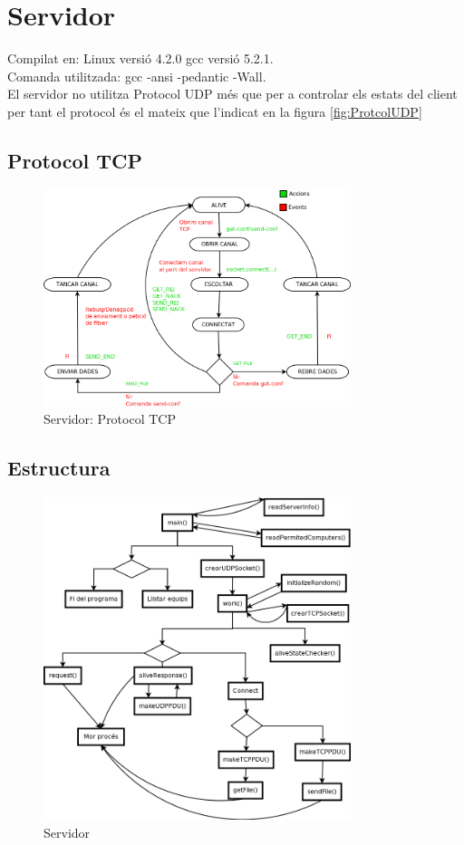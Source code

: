 \documentclass[11pt]{article}
\begin{document}
\section{Servidor}
Compilat en: Linux versió 4.2.0 gcc versió 5.2.1.\\
Comanda utilitzada: gcc -ansi -pedantic -Wall.\\
El servidor no utilitza Protocol UDP més que per a controlar els estats del client per tant el protocol és el mateix que l'indicat en la figura \ref{fig:ProtcolUDP}
\subsection{Protocol TCP}
\begin{figure}[h]
    \centering
    \includegraphics[width=0.8\textwidth]{ServidorTCP.png}
    \caption{Servidor: Protocol TCP}
    \label{fig:PrtocolTCPserv}
\end{figure}
\newpage

\subsection{Estructura}
\begin{figure}[h]
    \centering
    \includegraphics[width=0.8\textwidth]{server.png}
    \caption{Servidor}
    \label{fig:server}
\end{figure}
\newpage
\end{document}
